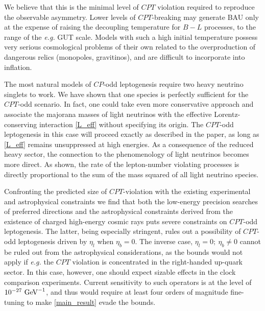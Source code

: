 \documentclass[12pt]{revtex4}
\newcommand{\GeV}{{\rm GeV}}
\begin{document}
We believe that this is the minimal level 
of $CPT$ violation required to reproduce the observable asymmetry. Lower levels of $CPT$-breaking 
may generate BAU 
only at the expense of  raising the decoupling temperature for $B-L$ processes, to the range of 
the {\em e.g.} GUT scale. Models with such a high initial temperature possess very serious cosmological 
problems of their own related to the overproduction of dangerous relics (monopoles, gravitinos), and 
are difficult to incorporate into inflation. 



   The most natural models of $CP$-odd leptogenesis require two heavy neutrino singlets
   to work. We have shown that one species is perfectly sufficient for the $CPT$-odd scenario. 
   In fact, one could take even more conservative approach and associate the majorana 
   masses of light neutrinos with the effective Lorentz-conserving interaction \eqref{L_eff} without 
   specifying its origin. The $CPT$-odd leptogenesis in this case will proceed exactly as 
described in the paper, as long as \eqref{L_eff} remains unsuppressed at high energies. 
As a consequence of  the reduced heavy sector, the 
connection to the phenomenology of light neutrinos becomes more 
direct. As shown, the rate of the lepton-number violating processes is 
directly proportional to the sum of the mass squared of all light neutrino species. 
	
	Confronting the predicted size of $CPT$-violation with the existing experimental 
	and astrophysical constraints we find that both the low-energy precision searches of preferred 
	directions and the astrophysical constraints derived from the 
existence of charged high-energy cosmic rays puts severe 
	constraints on $CPT$-odd leptogenesis. The latter, being 
especially stringent, rules out a possibility of $CPT$-odd leptogenesis
driven by $\eta_l$ when $\eta_b =0 $. The inverse case, $\eta_l=0;~\eta_b \neq0 $
cannot be ruled out from the astrophysical considerations, as the bounds would not apply
if {\em e.g.} the $CPT$ violation is concentrated in the right-handed up-quark sector. 
In this case, however, one should expect  sizable effects in the clock comparison 
experiments. Current sensitivity to such operators is at the level of $10^{-27}~\GeV^{-1}$, 
and thus would require at least four orders of magnitude fine-tuning to make \eqref{main_result} 
evade the bounds. 
\end{document}
